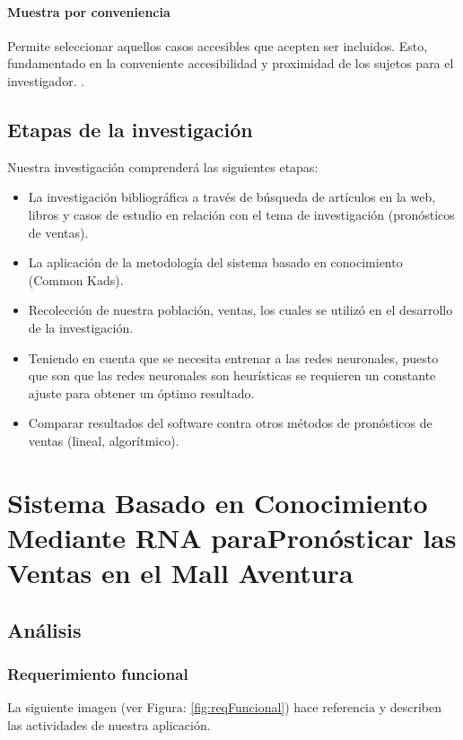 \subsubsection{Muestra por conveniencia}
Permite seleccionar aquellos casos accesibles que acepten ser incluidos. Esto, fundamentado en la conveniente accesibilidad y proximidad de los sujetos para el investigador. \citep{otzen2017tecnicas}.

\section{Etapas de la investigación}
Nuestra investigación comprenderá  las siguientes etapas:
\begin{itemize}
\item La investigación bibliográfica a través de búsqueda de artículos en la web, libros y casos de estudio en relación con el tema de investigación (pronósticos de ventas).
\item La aplicación de la metodología del sistema basado en conocimiento (Common Kads).
\item Recolección de nuestra población, ventas, los cuales se utilizó en el desarrollo de la investigación.
\item Teniendo en cuenta que se necesita entrenar a las redes neuronales, puesto que son  que las redes neuronales son heurísticas se requieren un constante ajuste para obtener un óptimo resultado.
\item Comparar resultados del software contra otros métodos de pronósticos de ventas (lineal, algorítmico).

\end{itemize}

\chapter{Sistema Basado en Conocimiento Mediante RNA paraPronósticar las Ventas en el Mall Aventura}
\renewcommand{\baselinestretch}{2} %

\section{Análisis}

\subsection{Requerimiento funcional}
La siguiente imagen (ver Figura: \ref{fig:reqFuncional}) hace referencia y describen las actividades de nuestra aplicación.

